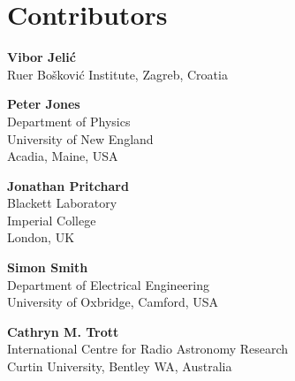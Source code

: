 
\chapter*{Contributors}
 


{\parskip=12pt

\noindent\textbf{Vibor Jeli\'c}\\
Ru{\dj}er Bo\v{s}kovi\'{c} Institute, Zagreb, Croatia 

\noindent\textbf{Peter Jones}\\
Department of Physics\\
University of New England\\
Acadia, Maine, USA

\noindent\textbf{Jonathan Pritchard}\\
Blackett Laboratory\\
Imperial College\\
London, UK

\noindent\textbf{Simon Smith}\\
Department of Electrical Engineering\\
University of Oxbridge, 
Camford, USA

\noindent\textbf{Cathryn M. Trott}\\
International Centre for Radio Astronomy Research\\
Curtin University, Bentley WA, Australia

}
